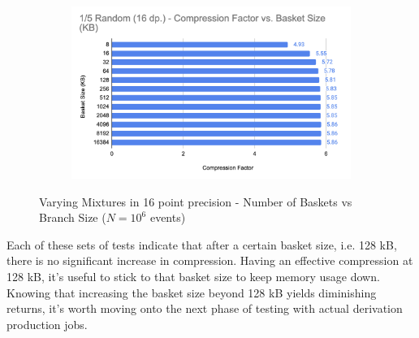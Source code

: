 \begin{figure}[h]
\begin{subfigure}{.5\textwidth}
        \label{fig:toymodel_418_compF_vs_basketsize_subC}
      \end{subfigure}%
      \begin{subfigure}{.5\textwidth}
        \centering
        \includegraphics[width=\textwidth]{content/toymodel_content/4.18/1_of_5.png}
        \label{fig:toymodel_418_compF_vs_basketsize_subD}
      \end{subfigure}%
      \caption{Varying Mixtures in 16 point precision - Number of Baskets vs Branch Size ($N=10^6$ events)}
      \label{fig:toymodel_418_compF_vs_basketsize}
\end{figure}


Each of these sets of tests indicate that after a certain basket size, i.e. 128 kB, there is no significant increase in compression. 
Having an effective compression at 128 kB, it's useful to stick to that basket size to keep memory usage down. 
Knowing that increasing the basket size beyond 128 kB yields diminishing returns, it's worth moving onto the next phase of testing with actual derivation production jobs.

